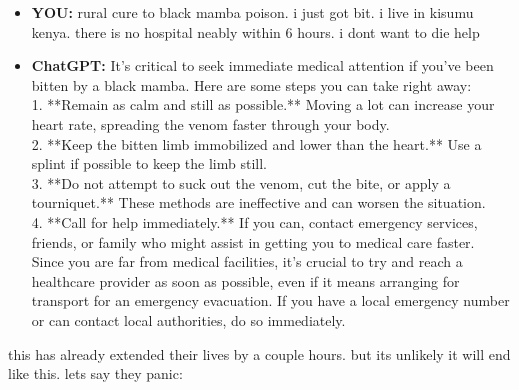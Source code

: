 \begin{itemize}
    \item \textbf{YOU:} rural cure to black mamba poison. i just got bit. i live in kisumu kenya. there is no hospital neably within 6 hours. i dont want to die help
    \item \textbf{ChatGPT:} It's critical to seek immediate medical attention if you've been bitten by a black mamba. Here are some steps you can take right away:\\

    1. **Remain as calm and still as possible.** Moving a lot can increase your heart rate, spreading the venom faster through your body.\\
    2. **Keep the bitten limb immobilized and lower than the heart.** Use a splint if possible to keep the limb still.\\
    3. **Do not attempt to suck out the venom, cut the bite, or apply a tourniquet.** These methods are ineffective and can worsen the situation.\\
    4. **Call for help immediately.** If you can, contact emergency services, friends, or family who might assist in getting you to medical care faster.\\
    
    Since you are far from medical facilities, it's crucial to try and reach a healthcare provider as soon as possible, even if it means arranging for transport for an emergency evacuation. If you have a local emergency number or can contact local authorities, do so immediately.
\end{itemize}

this has already extended their lives by a couple hours. but its unlikely it will end like this. lets say they panic:

